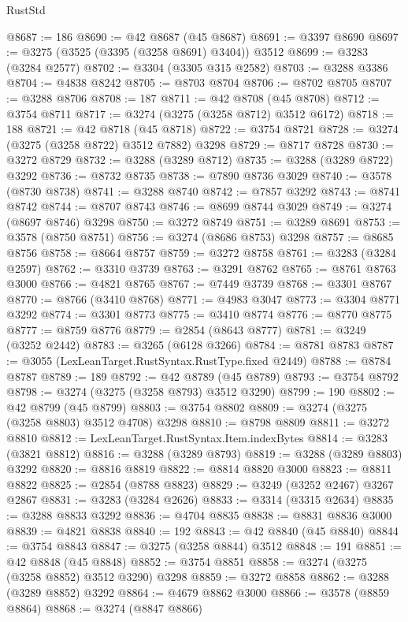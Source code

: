 \begin{lexlean}{RustStd}
\begin{coremodule}
@8687 := 186
@8690 := @42 @8687 (@45 @8687)
@8691 := @3397 @8690
@8697 := @3275 (@3525 (@3395 (@3258 @8691) @3404)) @3512
@8699 := @3283 (@3284 @2577)
@8702 := @3304 (@3305 @315 @2582)
@8703 := @3288 @3386
@8704 := @4838 @8242
@8705 := @8703 @8704
@8706 := @8702 @8705
@8707 := @3288 @8706
@8708 := 187
@8711 := @42 @8708 (@45 @8708)
@8712 := @3754 @8711
@8717 := @3274 (@3275 (@3258 @8712) @3512 @6172)
@8718 := 188
@8721 := @42 @8718 (@45 @8718)
@8722 := @3754 @8721
@8728 := @3274 (@3275 (@3258 @8722) @3512 @7882) @3298
@8729 := @8717 @8728
@8730 := @3272 @8729
@8732 := @3288 (@3289 @8712)
@8735 := @3288 (@3289 @8722) @3292
@8736 := @8732 @8735
@8738 := @7890 @8736 @3029
@8740 := @3578 (@8730 @8738)
@8741 := @3288 @8740
@8742 := @7857 @3292
@8743 := @8741 @8742
@8744 := @8707 @8743
@8746 := @8699 @8744 @3029
@8749 := @3274 (@8697 @8746) @3298
@8750 := @3272 @8749
@8751 := @3289 @8691
@8753 := @3578 (@8750 @8751)
@8756 := @3274 (@8686 @8753) @3298
@8757 := @8685 @8756
@8758 := @8664 @8757
@8759 := @3272 @8758
@8761 := @3283 (@3284 @2597)
@8762 := @3310 @3739
@8763 := @3291 @8762
@8765 := @8761 @8763 @3000
@8766 := @4821 @8765
@8767 := @7449 @3739
@8768 := @3301 @8767
@8770 := @8766 (@3410 @8768)
@8771 := @4983 @3047
@8773 := @3304 @8771 @3292
@8774 := @3301 @8773
@8775 := @3410 @8774
@8776 := @8770 @8775
@8777 := @8759 @8776
@8779 := @2854 (@8643 @8777)
@8781 := @3249 (@3252 @2442)
@8783 := @3265 (@6128 @3266)
@8784 := @8781 @8783
@8787 := @3055 (LexLeanTarget.RustSyntax.RustType.fixed @2449)
@8788 := @8784 @8787
@8789 := 189
@8792 := @42 @8789 (@45 @8789)
@8793 := @3754 @8792
@8798 := @3274 (@3275 (@3258 @8793) @3512 @3290)
@8799 := 190
@8802 := @42 @8799 (@45 @8799)
@8803 := @3754 @8802
@8809 := @3274 (@3275 (@3258 @8803) @3512 @4708) @3298
@8810 := @8798 @8809
@8811 := @3272 @8810
@8812 := LexLeanTarget.RustSyntax.Item.indexBytes
@8814 := @3283 (@3821 @8812)
@8816 := @3288 (@3289 @8793)
@8819 := @3288 (@3289 @8803) @3292
@8820 := @8816 @8819
@8822 := @8814 @8820 @3000
@8823 := @8811 @8822
@8825 := @2854 (@8788 @8823)
@8829 := @3249 (@3252 @2467) @3267 @2867
@8831 := @3283 (@3284 @2626)
@8833 := @3314 (@3315 @2634)
@8835 := @3288 @8833 @3292
@8836 := @4704 @8835
@8838 := @8831 @8836 @3000
@8839 := @4821 @8838
@8840 := 192
@8843 := @42 @8840 (@45 @8840)
@8844 := @3754 @8843
@8847 := @3275 (@3258 @8844) @3512
@8848 := 191
@8851 := @42 @8848 (@45 @8848)
@8852 := @3754 @8851
@8858 := @3274 (@3275 (@3258 @8852) @3512 @3290) @3298
@8859 := @3272 @8858
@8862 := @3288 (@3289 @8852) @3292
@8864 := @4679 @8862 @3000
@8866 := @3578 (@8859 @8864)
@8868 := @3274 (@8847 @8866)

\end{coremodule}
\end{lexlean}
